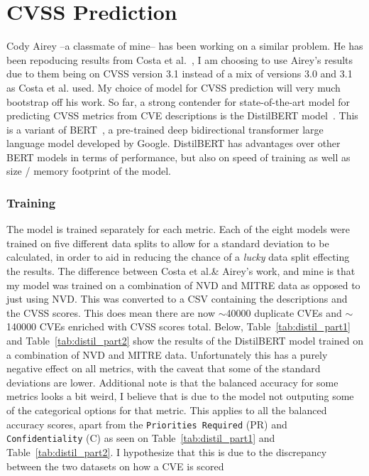 \documentclass[12pt]{article}
\begin{document}
\section{CVSS Prediction}\label{cvss_prediction}

Cody Airey --a classmate of mine-- has been working on a similar problem. He has been repoducing
results from Costa et al.\@~\cite{costa}, I am choosing to use Airey's results due to them being on
CVSS version 3.1 instead of a mix of versions 3.0 and 3.1 as Costa et al. used. My choice of model
for CVSS prediction will very much bootstrap off his work. So far, a strong contender for
state-of-the-art model for predicting CVSS metrics from CVE descriptions is the DistilBERT
model~\cite{distilbert}. This is a variant of BERT~\cite{BERT}, a pre-trained deep bidirectional
transformer large language model developed by Google. DistilBERT has advantages over other BERT
models in terms of performance, but also on speed of training as well as size / memory footprint of
the model.

\subsubsection{Training}

The model is trained separately for each metric. Each of the eight models were trained on five
different data splits to allow for a standard deviation to be calculated, in order to aid in
reducing the chance of a \textit{lucky} data split effecting the results. The difference between
Costa et al.\@ \& Airey's work, and mine is that my model was trained on a combination of NVD and
MITRE data as opposed to just using NVD. This was converted to a CSV containing the descriptions and
the CVSS scores. This does mean there are now $\sim$40000 duplicate CVEs and $\sim$140000 CVEs
enriched with CVSS scores total. Below, Table~\ref{tab:distil_part1} and Table~\ref{tab:distil_part2}
show the results of the DistilBERT model trained on a combination of NVD and MITRE data.
Unfortunately this has a purely negative effect on all metrics, with the caveat that some of the
standard deviations are lower. Additional note is that the balanced accuracy for some metrics looks
a bit weird, I believe that is due to the model not outputing some of the categorical options for
that metric. This applies to all the balanced accuracy scores, apart from the \texttt{Priorities
	Required} (PR) and \texttt{Confidentiality} (C) as seen on Table~\ref{tab:distil_part1} and
Table~\ref{tab:distil_part2}.
I hypothesize that this is due to the discrepancy between the two datasets on how a CVE is scored
\end{document}
